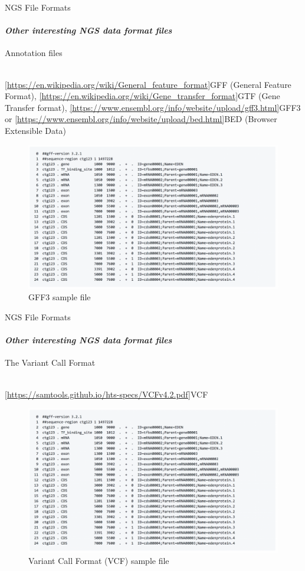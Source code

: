 \documentclass{if-beamer}
\begin{document}
\begin{frame}{NGS File Formats}
\framesubtitle{\emph{Other interesting NGS data format files}}
\begin{huge}
\centering
Annotation files
\\~\\
\end{huge}
\centering
\cref{https://en.wikipedia.org/wiki/General_feature_format}{GFF (General Feature Format)}, \cref{https://en.wikipedia.org/wiki/Gene_transfer_format}{GTF (Gene Transfer format)}, \cref{https://www.ensembl.org/info/website/upload/gff3.html}{GFF3} or \cref{https://www.ensembl.org/info/website/upload/bed.html}{BED (Browser Extensible Data)}
\begin{figure}
\centering
\includegraphics[scale=0.2]{gff3.png}
\caption{GFF3 sample file}
\end{figure}
\end{frame}
\begin{frame}{NGS File Formats}
\framesubtitle{\emph{Other interesting NGS data format files}}
\begin{huge}
\centering
The Variant Call Format
\\~\\
\end{huge}
\centering
\cref{https://samtools.github.io/hts-specs/VCFv4.2.pdf}{VCF}
\begin{figure}
\centering
\includegraphics[scale=0.2]{gff3.png}
\caption{Variant Call Format (VCF) sample file}
\end{figure}
\end{frame}
\end{document}
